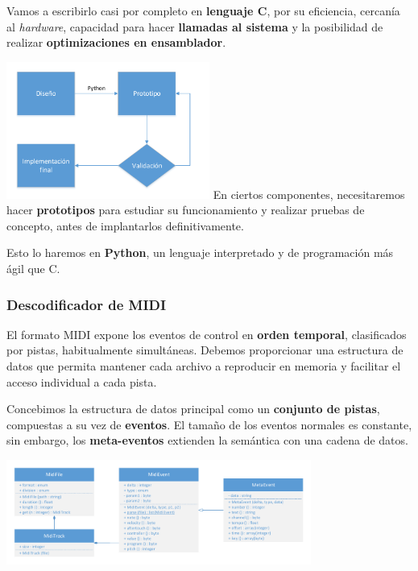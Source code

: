 \documentclass[10pt,a4paper]{article}
\begin{document}
	 Vamos a escribirlo casi por completo en \textbf{lenguaje C}, por su eficiencia, cercanía al \textit{hardware}, capacidad para hacer \textbf{llamadas al sistema} y la posibilidad de realizar \textbf{optimizaciones en ensamblador}.
	 
	 \begin{multicols}{2}
	 	\noindent
	 	\includegraphics[width=0.5\textwidth]{images/prototipado} 
	 	\columnbreak
	 	En ciertos componentes, necesitaremos hacer \textbf{prototipos} para estudiar su funcionamiento y realizar pruebas de concepto, antes de implantarlos definitivamente. 
	 	
	 	Esto lo haremos en \textbf{Python}, un lenguaje interpretado y de programación más ágil que C.
	 \end{multicols}
	
	\subsubsection*{Descodificador de MIDI}
	
	El formato MIDI expone los eventos de control en \textbf{orden temporal}, clasificados por pistas, habitualmente simultáneas. Debemos proporcionar una estructura de datos que permita mantener cada archivo a reproducir en memoria y facilitar el acceso individual a cada pista.
	
	Concebimos la estructura de datos principal como un \textbf{conjunto de pistas}, compuestas a su vez de \textbf{eventos}. El tamaño de los eventos normales es constante, sin embargo, los \textbf{meta-eventos} extienden la semántica con una cadena de datos.
	
	\begin{center}
		\includegraphics[width=0.75\textwidth]{images/uml_midi}
	\end{center}
	
\end{document}
